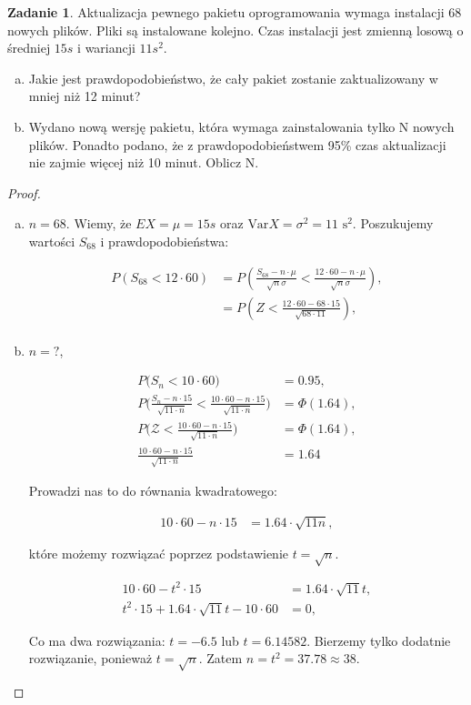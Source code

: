 \documentclass[11pt]{article}
\theoremstyle{definition}
\newtheorem{zadanie}{Zadanie}
\newcommand{\Var}{\text{Var}}
\begin{document}
\newpage
\begin{zadanie}
    Aktualizacja pewnego pakietu oprogramowania wymaga instalacji 68 nowych plików. Pliki są instalowane kolejno.
    Czas instalacji jest zmienną losową o średniej $15 s$ i wariancji $11 s^2$.
    \begin{enumerate}[a)]
        \item Jakie jest prawdopodobieństwo, że cały pakiet zostanie zaktualizowany w mniej niż 12 minut?
        \item Wydano nową wersję pakietu, która wymaga zainstalowania tylko N nowych plików. Ponadto podano, że z prawdopodobieństwem 95\% czas aktualizacji nie zajmie więcej niż 10 minut. Oblicz N.
    \end{enumerate}
\end{zadanie}
\begin{proof}

    \begin{enumerate}[a)]

        \item     $n = 68$. Wiemy, że $EX=\mu=15 s$ oraz $\Var X =\sigma^2= 11\text{ s}^2$. Poszukujemy wartości $S_{68}$ i prawdopodobieństwa:

    \begin{align*}
        P(S_{68}< 12\cdot60) & = P(\frac{S_{68}-n\cdot\mu}{\sqrt{n}\sigma} < \frac{12\cdot60-n\cdot\mu}{\sqrt{n}\sigma}), \\
                             & = P(Z < \frac{12\cdot60-68\cdot15}{\sqrt{68\cdot 11}}),                                    \\
    \end{align*}

\item $n=?$, 

\begin{align*}
P\Bigg(S_n < 10\cdot60\Bigg) &= 0.95,\\
P\Bigg( \frac{S_n-n\cdot 15}{\sqrt{11\cdot n}}  <  \frac{10\cdot60-n\cdot 15}{\sqrt{11\cdot n}} \Bigg) &= \Phi(1.64),\\
P\Bigg(\mathcal Z < \frac{10\cdot60-n\cdot 15}{\sqrt{11\cdot n}} \Bigg) &= \Phi(1.64),\\
\frac{10\cdot60-n\cdot 15}{\sqrt{11\cdot n}} &= 1.64
\end{align*}

Prowadzi nas to do równania kwadratowego:

\begin{align*}
10\cdot60 - n\cdot 15 &= 1.64\cdot\sqrt{11n},
\end{align*}

które możemy rozwiązać poprzez podstawienie $t=\sqrt n$.

\begin{align*}
    10\cdot60 - t^2\cdot 15 &= 1.64\cdot\sqrt{11}t,\\
    t^2\cdot 15+1.64\cdot\sqrt{11}t - 10\cdot60 &=0,
    \end{align*}
    
Co ma dwa rozwiązania: $t = -6.5$ lub $t=6.14582$. Bierzemy tylko dodatnie rozwiązanie, ponieważ $t= \sqrt n$. Zatem $n=t^2 = 37.78\approx 38$.
\end{enumerate}
\end{proof}
\end{document}
